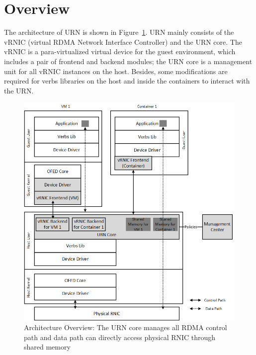 \section{Overview}
The architecture of URN is shown in Figure~\ref{fig:framework-overview}. URN mainly consists of the vRNIC (virtual RDMA Network Interface Controller) and the URN core. The vRNIC is a para-virtualized virtual device for the guest environment, which includes a pair of frontend and backend modules; the URN core is a management unit for all vRNIC instances on the host. Besides, some modifications are required for  verbs libraries on the host and inside the containers to interact with the URN.

\begin{figure}[!ht]
	\centering
	\includegraphics[width=1\linewidth]{images/framework-overview.png}
	\caption{Architecture Overview: The URN core manages all RDMA control path and data path can directly access physical RNIC through shared memory}
	\label{fig:framework-overview}
\end{figure}

